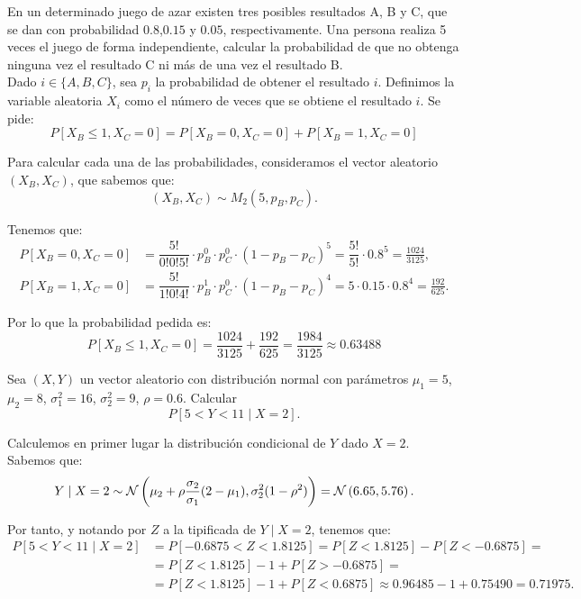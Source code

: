 \begin{ejercicio}
    En un determinado juego de azar existen tres posibles resultados A, B y C, que se dan con probabilidad $0.8$,$0.15$ y $0.05$, respectivamente. Una persona realiza 5 veces el juego de forma independiente, calcular la probabilidad de que no obtenga ninguna vez el resultado C ni más de una vez el resultado B.\\

    Dado $i\in \{A,B,C\}$, sea $p_i$ la probabilidad de obtener el resultado $i$. Definimos la variable aleatoria $X_i$ como el número de veces que se obtiene el resultado $i$. Se pide:
    \begin{equation*}
        P[X_B \leq 1,X_C = 0] = P[X_B = 0,X_C = 0] + P[X_B = 1,X_C = 0]
    \end{equation*}

    Para calcular cada una de las probabilidades, consideramos el vector aleatorio $(X_B,X_C)$, que sabemos que:
    \begin{equation*}
        (X_B,X_C) \sim M_2\left(5,p_B,p_C\right).
    \end{equation*}

    Tenemos que:
    \begin{align*}
        P[X_B = 0,X_C = 0] &= \dfrac{5!}{0!0!5!}\cdot p_B^0 \cdot p_C^0 \cdot (1-p_B-p_C)^5 = \dfrac{5!}{5!} \cdot 0.8^5 = \frac{1024}{3125},\\
        P[X_B = 1,X_C = 0] &= \dfrac{5!}{1!0!4!}\cdot p_B^1 \cdot p_C^0 \cdot (1-p_B-p_C)^4 = 5 \cdot 0.15 \cdot 0.8^4= \frac{192}{625}.
    \end{align*}

    Por lo que la probabilidad pedida es:
    \begin{equation*}
        P[X_B \leq 1,X_C = 0] = \frac{1024}{3125} + \frac{192}{625} = \frac{1984}{3125} \approx 0.63488
    \end{equation*}
\end{ejercicio}

\begin{ejercicio}
    Sea $(X,Y)$ un vector aleatorio con distribución normal con parámetros $\mu_1 = 5$, $\mu_2 = 8$, $\sigma_1^2 = 16$, $\sigma_2^2 = 9$, $\rho = 0.6$. Calcular
    \[
        P[5 < Y < 11 \mid X = 2].
    \]

    Calculemos en primer lugar la distribución condicional de $Y$ dado $X = 2$. Sabemos que:
    \begin{equation*}
        Y \mid X = 2 \sim \mathcal{N}\left(\mu_2 + \rho\dfrac{\sigma_2}{\sigma_1}(2-\mu_1),\sigma_2^2(1-\rho^2)\right)
        = \mathcal{N}\left(6.65, 5.76\right).
    \end{equation*}

    Por tanto, y notando por $Z$ a la tipificada de $Y\mid X=2$, tenemos que:
    \begin{align*}
        P[5 < Y < 11 \mid X = 2] &= P[-0.6875 < Z < 1.8125] = P[Z < 1.8125] - P[Z < -0.6875] =\\
        &= P[Z < 1.8125] - 1+P[Z > -0.6875]
        =\\&= P[Z < 1.8125] - 1+P[Z < 0.6875] \approx 0.96485-1+0.75490 = 0.71975.
    \end{align*}
\end{ejercicio}

